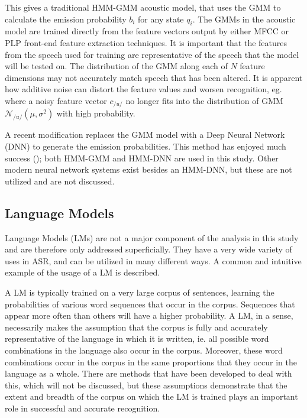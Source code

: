 This gives a traditional HMM-GMM acoustic model, that uses the GMM to calculate the emission probability $b_i$ for any state $q_i$.  The GMMs in the acoustic model are trained directly from the feature vectors output by either MFCC or PLP front-end feature extraction techniques.  It is important that the features from the speech used for training are representative of the speech that the model will be tested on.  The distribution of the GMM along each of $N$ feature dimensions may not accurately match speech that has been altered.  It is apparent how additive noise can distort the feature values and worsen recognition, eg. where a noisy feature vector $c_{/u/}$ no longer fits into the distribution of GMM $\mathcal{N}_{/u/}(\mu,\sigma^2)$ with high probability.

A recent modification replaces the GMM model with a Deep Neural Network (DNN) to generate the emission probabilities. This method has enjoyed much success (\cite{zhang:17}); both HMM-GMM and HMM-DNN are used in this study.  Other modern neural network systems exist besides an HMM-DNN, but these are not utilized and are not discussed.





\subsection{Language Models}\label{sec:lang-mod}

Language Models (LMs) are not a major component of the analysis in this study and are therefore only addressed superficially.  They have a very wide variety of uses in ASR, and can be utilized in many different ways.  A common and intuitive example of the usage of a LM is described.

A LM is typically trained on a very large corpus of sentences, learning the probabilities of various word sequences that occur in the corpus.  Sequences that appear more often than others will have a higher probability.  A LM, in a sense, necessarily makes the assumption that the corpus is fully and accurately representative of the language in which it is written, ie. all possible word combinations in the language also occur in the corpus. Moreover, these word combinations occur in the corpus in the same proportions that they occur in the language as a whole.  There are methods that have been developed to deal with this, which will not be discussed, but these assumptions demonstrate that the extent and breadth of the corpus on which the LM is trained plays an important role in successful and accurate recognition.  


